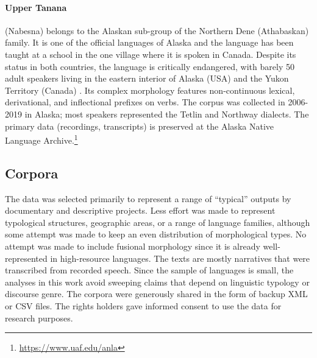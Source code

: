 \paragraph{Upper Tanana}
(Nabesna) belongs to the Alaskan sub-group of the Northern Dene (Athabaskan) family. It is one of the official languages of Alaska and the language has been taught at a school in the one village where it is spoken in Canada. Despite its status in both countries, the language is critically endangered, with barely 50 adult speakers living in the eastern interior of Alaska (USA) and the Yukon Territory (Canada) \citep{lovick_grammar_2020}. Its complex morphology features non-continuous lexical, derivational, and inflectional prefixes on verbs. The corpus was collected in 2006-2019 in Alaska; most speakers represented the Tetlin and Northway dialects. 
The primary data (recordings, transcripts) is preserved at the Alaska Native Language Archive.\footnote{\url{https://www.uaf.edu/anla}}



\subsection{Corpora}


The data was selected primarily to represent a range of “typical” outputs by documentary and descriptive projects. Less effort was made to represent typological structures, geographic areas, or a range of language families, although some attempt was made to keep an even distribution of morphological types. No attempt was made to include fusional morphology since it is already well-represented in high-resource languages. The texts are mostly narratives that were transcribed from recorded speech. Since the sample of languages is small, the analyses in this work avoid sweeping claims that depend on linguistic typology or discourse genre. 
The corpora were generously shared in the form of backup XML or CSV files. The rights holders gave informed consent to use the data for research purposes. 

